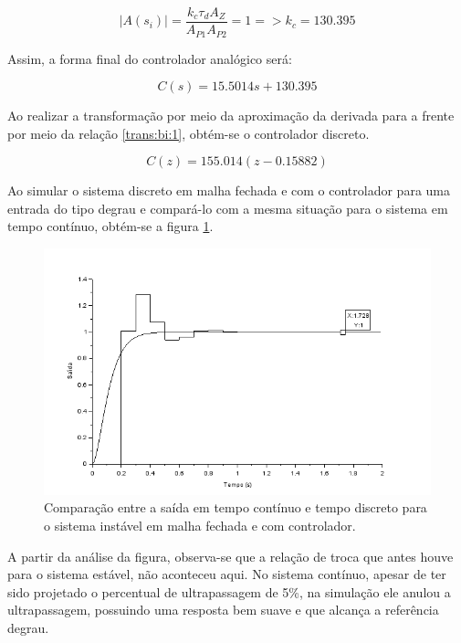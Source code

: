 \begin{equation} \label{pid:7}
    |A(s_i)| = \frac{k_c \tau_d A_Z}{A_{P1} A_{P2} } = 1 => k_c = 130.395
\end{equation}

Assim, a forma final do controlador analógico será:

\begin{equation} \label{pid:8}
    C(s) = 15.5014s + 130.395
\end{equation}

Ao realizar a transformação por meio da aproximação da derivada para a frente por meio da relação \ref{trans:bi:1}, obtém-se o controlador discreto.

\begin{equation} \label{trans:bi:4}
    C(z) = 155.014(z-0.15882)
\end{equation}

Ao simular o sistema discreto em malha fechada e com o controlador para uma entrada do tipo degrau e compará-lo com a mesma situação para o sistema em tempo contínuo, obtém-se a figura \ref{mf:2}.

\begin{figure}[H]
\begin{center}
\includegraphics[width=12cm]{images/mf/mf_instavel.png}
\caption{Comparação entre a saída em tempo contínuo e tempo discreto para o sistema instável em malha fechada e com controlador.}
\label{mf:2} 
\end{center}
\end{figure}

A partir da análise da figura, observa-se que a relação de troca que antes houve para o sistema estável, não aconteceu aqui. No sistema contínuo, apesar de ter sido projetado o percentual de ultrapassagem de 5\%, na simulação ele anulou a ultrapassagem, possuindo uma resposta bem suave e que alcança a referência degrau. 

